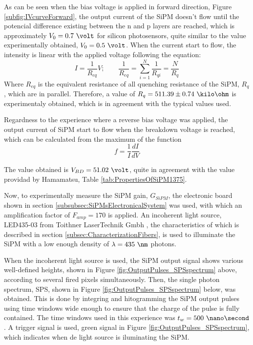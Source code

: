 As can be seen when the bias voltage is applied in forward direction, Figure \ref{subfig:IVcurveForward}, the output current of the SiPM doesn't flow until the potencial difference existing between the n and p layers are reached, which is approximately $V_0=0.7~\volt$ for silicon photosensors, quite similar to the value experimentally obtained, $V_0= 0.5~\volt$. When the current start to flow, the intensity is linear with the applied voltage following the equation:
\begin{equation}
I=\frac{1}{R_{eq}}V;  \qquad \frac{1}{R_{eq}} = \sum_{i=1}^{N}\frac{1}{R_{qi}}= \frac{N}{R_{q}}
\label{QuenchingResistance}
\end{equation}
Where $R_{eq}$ is the equivalent resistance of all quenching resistance of the SiPM, $R_{q}$, which are in parallel. Therefore, a value of $R_{q}= 511.39 \pm 0.74~\kilo\ohm$ is experimentaly obtained, which is in agreement with the typical values used.

Regardness to the experience where a reverse bias voltage was applied, the output current of SiPM start to flow when the breakdown voltage is reached, which can be calculated from the maximum of the function 
\begin{equation}
f=\frac{1}{I}\frac{dI}{dV}
\label{BreakDownVoltageFunction}
\end{equation}

The value obtained is $V_{BD}=51.02~\volt$, quite in agreement with the value providad by Hamamatsu, Table \ref{tab:PropertiesOfSiPM1375}.

Now, to experimentally measure the SiPM gain, $G_{SiPM}$, the electronic board shown in section \ref{subsubsec:SiPMsElectronicalSystem} was used, with which an amplification factor of $F_{amp}=170$ is applied. An incoherent light source, LED435-03 from Toithner LaserTechnik Gmbh \cite{LEDRLT}, the characteristics of which is described in section \ref{subsec:CharacterizationFibers}, is used to illuminate the SiPM with a low enough density of $\lambda= 435~\nm$ photons.

When the incoherent light source is used, the SiPM output signal shows various well-defined heights, shown in Figure \ref{fig:OutputPulses_SPSspectrum} above, according to several fired pixels simultaneously. Then, the single photon spectrum, SPS, shown in Figure \ref{fig:OutputPulses_SPSspectrum} below, was obtained. This is done by integring and hitogramming the SiPM output pulses using time windows wide enough to ensure that the charge of the pulse is fully contained. The time windows used in this experience was $t_w= 500~\nano\second$. A trigger signal is used, green signal in Figure \ref{fig:OutputPulses_SPSspectrum}, which indicates when de light source is iluminating the SiPM.

